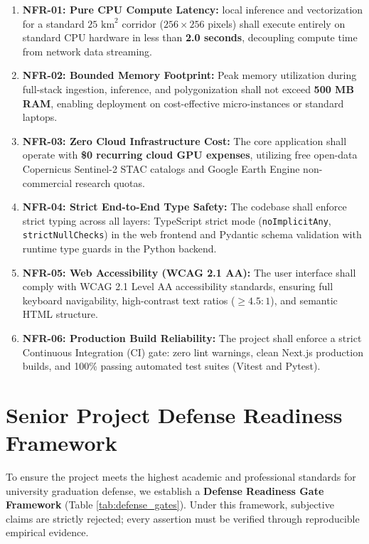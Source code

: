 \begin{enumerate}
    \item \textbf{NFR-01: Pure CPU Compute Latency:} local inference and vectorization for a standard $25\text{ km}^2$ corridor ($256 \times 256$ pixels) shall execute entirely on standard CPU hardware in less than \textbf{2.0 seconds}, decoupling compute time from network data streaming.
    \item \textbf{NFR-02: Bounded Memory Footprint:} Peak memory utilization during full-stack ingestion, inference, and polygonization shall not exceed \textbf{500 MB RAM}, enabling deployment on cost-effective micro-instances or standard laptops.
    \item \textbf{NFR-03: Zero Cloud Infrastructure Cost:} The core application shall operate with \textbf{\$0 recurring cloud GPU expenses}, utilizing free open-data Copernicus Sentinel-2 STAC catalogs and Google Earth Engine non-commercial research quotas.
    \item \textbf{NFR-04: Strict End-to-End Type Safety:} The codebase shall enforce strict typing across all layers: TypeScript strict mode (\texttt{noImplicitAny}, \texttt{strictNullChecks}) in the web frontend and Pydantic schema validation with runtime type guards in the Python backend.
    \item \textbf{NFR-05: Web Accessibility (WCAG 2.1 AA):} The user interface shall comply with WCAG 2.1 Level AA accessibility standards, ensuring full keyboard navigability, high-contrast text ratios ($\ge 4.5:1$), and semantic HTML structure.
    \item \textbf{NFR-06: Production Build Reliability:} The project shall enforce a strict Continuous Integration (CI) gate: zero lint warnings, clean Next.js production builds, and 100\% passing automated test suites (Vitest and Pytest).
\end{enumerate}

\section{Senior Project Defense Readiness Framework}
\label{sec:req_defense_framework}
To ensure the project meets the highest academic and professional standards for university graduation defense, we establish a \textbf{Defense Readiness Gate Framework} (Table \ref{tab:defense_gates}). Under this framework, subjective claims are strictly rejected; every assertion must be verified through reproducible empirical evidence.

